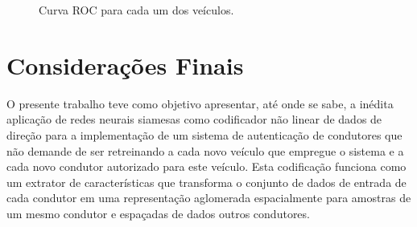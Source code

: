 \documentclass[conference,harvard,brazil,english]{sbatex}
\begin{document}
\begin{figure}[!ht]
    \caption{Curva ROC para cada um dos veículos.}
    \label{fig:roc}
\end{figure}

\section{Considerações Finais} \label{sec:finais}

O presente trabalho teve como objetivo apresentar, até onde se sabe, a inédita aplicação de redes neurais siamesas como codificador não linear de dados de direção para a implementação de um sistema de autenticação de condutores que não demande de ser retreinando a cada novo veículo que empregue o sistema e a cada novo condutor autorizado para este veículo. Esta codificação funciona como um extrator de características que transforma o conjunto de dados de entrada de cada condutor em uma representação aglomerada espacialmente para amostras de um mesmo condutor e espaçadas de dados outros condutores.
\end{document}
